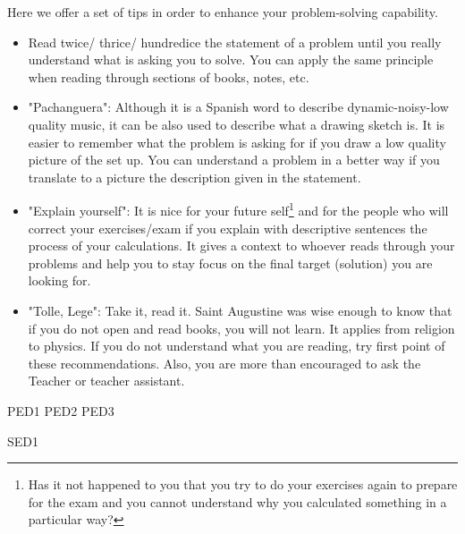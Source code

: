 \documentclass[a4paper,12pt]{article}
\begin{document}
Here we offer a set of tips in order to enhance your problem-solving capability.

\begin{itemize}
	\item Read twice/ thrice/ hundredice the statement of a problem until you really understand what is asking you to solve. You can apply the same principle when reading through sections of books, notes, etc.
	
	\item "Pachanguera": Although it is a Spanish word to describe dynamic-noisy-low quality music, it can be also used to describe what a drawing sketch is. It is easier to remember what the problem is asking for if you draw a low quality picture of the set up. You can understand a problem in a better way if you translate to a picture the description given in the statement.
	
	\item "Explain yourself": It is nice for your future self\footnote{Has it not happened to you that you try to do your exercises again to prepare for the exam and you cannot understand why you calculated something in a particular way?} and for the people who will correct your exercises/exam if you explain with descriptive sentences the process of your calculations. It gives a context to whoever reads through your problems and help you to stay focus on the final target (solution) you are looking for.
	
	\item "Tolle, Lege": Take it, read it. Saint Augustine was wise enough to know that if you do not open and read books, you will not learn. It applies from religion to physics. If you do not understand what you are reading, try first point of these recommendations. Also, you are more than encouraged to ask the Teacher or teacher assistant.
\end{itemize}

\newpage


{PED1}
{PED2}
{PED3}


{SED1}









  
\end{document}
